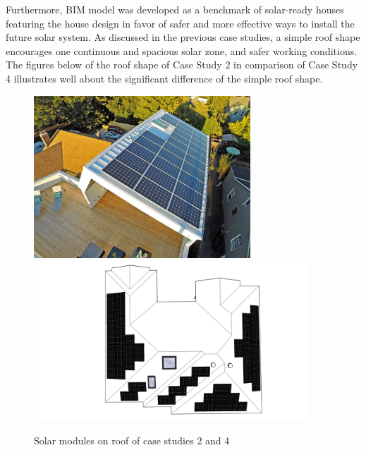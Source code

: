 \documentclass[]{article}
\begin{document}
Furthermore, BIM model was developed as a benchmark of solar-ready
houses featuring the house design in favor of safer and more effective
ways to install the future solar system. As discussed in the previous
case studies, a simple roof shape encourages one continuous and spacious
solar zone, and safer working conditions. The figures below of the roof
shape of Case Study 2 in comparison of Case Study 4 illustrates well
about the significant difference of the simple roof shape.

\begin{figure}
\includegraphics[width=3.2in]{../case/case2/dwelldevelopmentsolar2} \includegraphics[width=4.04in]{../case/case4/ColorOH} \caption{Solar modules on roof of case studies 2 and 4}\label{fig:unnamed-chunk-6}
\end{figure}
\end{document}

